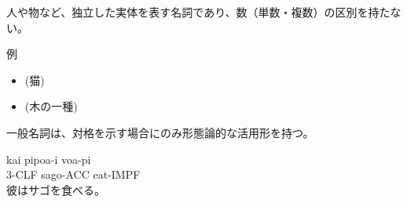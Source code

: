 人や物など、独立した実体を表す名詞であり、数（単数・複数）の区別を持たない。

例
\begin{itemize}
\item {} (猫)
\item {} (木の一種)
\end{itemize}

一般名詞は、対格を示す場合にのみ形態論的な活用形を持つ。

\begin{exe}
    \ex \gll kai pipoa-i voa-pi \\
        3-CLF sago-ACC eat-IMPF \\
        \glt 彼はサゴを食べる。
\end{exe}